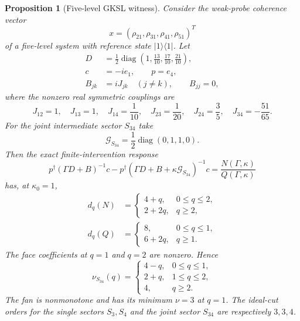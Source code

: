 \documentclass[11pt]{article}
\newtheorem{proposition}[theorem]{Proposition}
\theoremstyle{definition}
\theoremstyle{remark}
\theoremstyle{plain}
\newcommand{\Gcut}{\mathcal G}
\begin{document}
\begin{proposition}[Five-level GKSL witness]\label{prop:phase-n}
Consider the weak-probe coherence vector
\[
 x=(\rho_{21},\rho_{31},\rho_{41},\rho_{51})^T
\]
of a five-level system with reference state $\lvert1\rangle\langle1\rvert$.
Let
\begin{align}
 D&=\frac12\operatorname{diag}
 \left(1,\frac{13}{10},\frac{17}{10},\frac{21}{10}\right),\\
 c&=-i e_1,\qquad p=e_4,\\
 B_{jk}&=iJ_{jk}\quad(j\ne k),\qquad B_{jj}=0,
\end{align}
where the nonzero real symmetric couplings are
\[
 J_{12}=1,\quad J_{13}=1,\quad J_{14}=\frac1{10},\quad
 J_{23}=\frac1{20},\quad J_{24}=\frac35,\quad
 J_{34}=-\frac{51}{65}.
\]
For the joint intermediate sector $S_{34}$ take
\[
 \Gcut_{S_{34}}=\frac12\operatorname{diag}(0,1,1,0).
\]
Then the exact finite-intervention response
\[
 p^\dagger(\Gamma D+B)^{-1}c
 -p^\dagger(\Gamma D+B+\kappa\Gcut_{S_{34}})^{-1}c
 =\frac{N(\Gamma,\kappa)}{Q(\Gamma,\kappa)}
\]
has, at $\kappa_0=1$,
\begin{align}
 d_q(N)&=
 \begin{cases}4+q,&0\le q\le2,\\2+2q,&q\ge2,\end{cases}\\
 d_q(Q)&=
 \begin{cases}8,&0\le q\le1,\\6+2q,&q\ge1.\end{cases}
\end{align}
The face coefficients at $q=1$ and $q=2$ are nonzero.  Hence
\begin{equation}\label{eq:phase-n-fan}
 \boxed{
 \nu_{S_{34}}(q)=
 \begin{cases}
 4-q,&0\le q\le1,\\
 2+q,&1\le q\le2,\\
 4,&q\ge2.
 \end{cases}}
\end{equation}
The fan is nonmonotone and has its minimum $\nu=3$ at $q=1$.
The ideal-cut orders for the single sectors $S_3,S_4$ and the joint sector
$S_{34}$ are respectively $3,3,4$.
\end{proposition}
\end{document}
